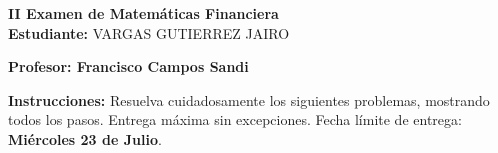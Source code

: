 \documentclass[10pt]{article}
\begin{document}
\newpage
\begin{center}
    {\LARGE \textbf{II Examen de Matemáticas Financiera}}\\[1em]
    {\large \textbf{Estudiante:} VARGAS GUTIERREZ JAIRO}
\end{center}

\vspace{1cm}

\textbf{Profesor: Francisco Campos Sandi}

\vspace{0.5cm}

\textbf{Instrucciones:} Resuelva cuidadosamente los siguientes problemas, mostrando todos los pasos. Entrega máxima sin excepciones. Fecha límite de entrega: \textbf{Miércoles 23 de Julio}.

\vspace{1cm}
\end{document}
